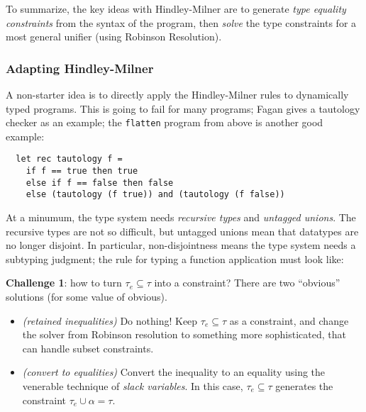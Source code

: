 \documentclass{article}
\begin{document}
To summarize, the key ideas with Hindley-Milner are to generate
 \emph{type equality constraints} from the syntax of the program, then
 \emph{solve} the type constraints for a most general unifier
 (using Robinson Resolution).


\subsubsection*{Adapting Hindley-Milner}

A non-starter idea is to directly apply the Hindley-Milner rules to dynamically
 typed programs.
This is going to fail for many programs; Fagan gives a tautology checker as an
 example; the {\tt flatten} program from above is another good example:

\begin{verbatim}
  let rec tautology f =
    if f == true then true
    else if f == false then false
    else (tautology (f true)) and (tautology (f false))
\end{verbatim}

At a minumum, the type system needs \emph{recursive types} and \emph{untagged unions}.
The recursive types are not so difficult, but untagged unions mean that datatypes
 are no longer disjoint.
In particular, non-disjointness means the type system needs a subtyping judgment;
 the rule for typing a function application must look like:

\begin{mathpar}
\end{mathpar}

\noindent \textbf{Challenge 1}: how to turn $\tau_e \subseteq \tau$ into a constraint?
There are two ``obvious'' solutions (for some value of obvious).

\begin{itemize}
\item
  \emph{(retained inequalities)}
  Do nothing!
  Keep $\tau_e \subseteq \tau$ as a constraint, and change the solver from
   Robinson resolution to something more sophisticated, that can handle
   subset constraints.
\item
  \emph{(convert to equalities)}
  Convert the inequality to an equality using the venerable technique of
   \emph{slack variables}.
  In this case, $\tau_e \subseteq \tau$ generates the constraint
   $\tau_e \cup \alpha = \tau$.
\end{itemize}
\end{document}

